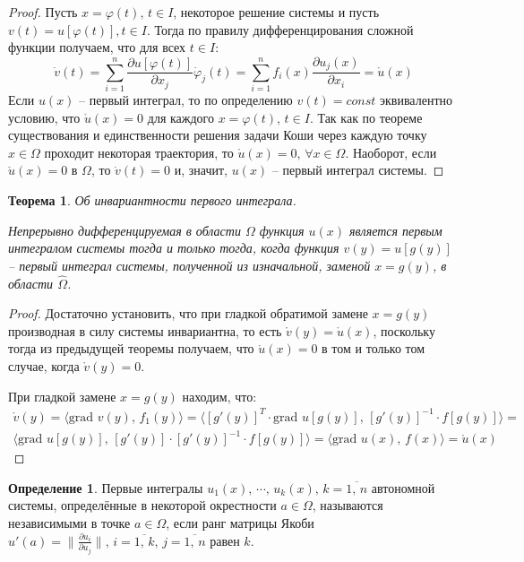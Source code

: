 \documentclass[a4paper,12pt]{article}
\renewcommand{\phi}{\ensuremath{\varphi}}
\theoremstyle{plain}
\newtheorem{theorem}{Теорема}[section]
\theoremstyle{definition}
\newtheorem{definition}{Определение}[section]
\theoremstyle{remark}
\begin{document}
\begin{proof}
	Пусть $x = \phi(t),\, t \in I$, некоторое решение системы и пусть $v(t) = u[\phi(t)], t \in I$. Тогда по правилу дифференцирования сложной функции получаем, что для всех $t \in I$:
	\[\dot{v}(t) = \sum_{i = 1}^n \frac{\partial u[\phi(t)]}{\partial x_j}\dot{\phi}_j(t) = \sum_{i = 1}^n f_i(x)\frac{\partial u_j(x)}{\partial x_i} = \mathring{u}(x)\]
	Если $u(x)$ -- первый интеграл, то по определению $v(t) = const$ эквивалентно условию, что $\mathring{u}(x) = 0$ для каждого $x = \phi(t),\, t \in I$. Так как по теореме существования и единственности решения задачи Коши через каждую точку $x \in \Omega$ проходит некоторая траектория, то $\mathring{u}(x) = 0,\, \forall x \in \Omega$. Наоборот, если $\mathring{u}(x) = 0$ в $\Omega$, то $\dot{v}(t) = 0$ и, значит, $u(x)$ -- первый интеграл системы.
\end{proof}

\begin{theorem}
	Об инвариантности первого интеграла.

	Непрерывно дифференцируемая в области $\Omega$ функция $u(x)$ является первым интегралом системы тогда и только тогда, когда функция $v(y) = u[g(y)]$ -- первый интеграл системы, полученной из изначальной, заменой $x = g(y)$, в области $\hat{\Omega}$.
\end{theorem}

\begin{proof}
	Достаточно установить, что при гладкой обратимой замене $x = g(y)$ производная в силу системы инвариантна, то есть $\mathring{v}(y) = \mathring{u}(x)$, поскольку тогда из предыдущей теоремы получаем, что $\mathring{u}(x) = 0$ в том и только том случае, когда $\mathring{v}(y) = 0$.

	При гладкой замене $x = g(y)$ находим, что:
	\begin{align*}
		\mathring{v}(y) = \langle \text{grad }v(y),\, f_1(y)\rangle = \langle [g'(y)]^T \cdot \text{grad }u[g(y)],\, [g'(y)]^{-1}\cdot f[g(y)]\rangle = \\
		\langle \text{grad }u[g(y)],\, [g'(y)] \cdot [g'(y)]^{-1}\cdot f[g(y)] \rangle = \langle \text{grad }u(x),\, f(x)\rangle = \mathring{u}(x)
	\end{align*}
\end{proof}

\begin{definition}
	Первые интегралы $u_1(x),\,\cdots,\,u_k(x),\, k = \overline{1,\,n}$ автономной системы, определённые в некоторой окрестности $a \in \Omega$, называются независимыми в точке $a \in \Omega$, если ранг матрицы Якоби $u'(a) = \|\frac{\partial u_i}{\partial u_j}\|,\, i = \overline{1,\,k},\, j = \overline{1,\,n}$ равен $k$.
\end{definition}
\end{document}
